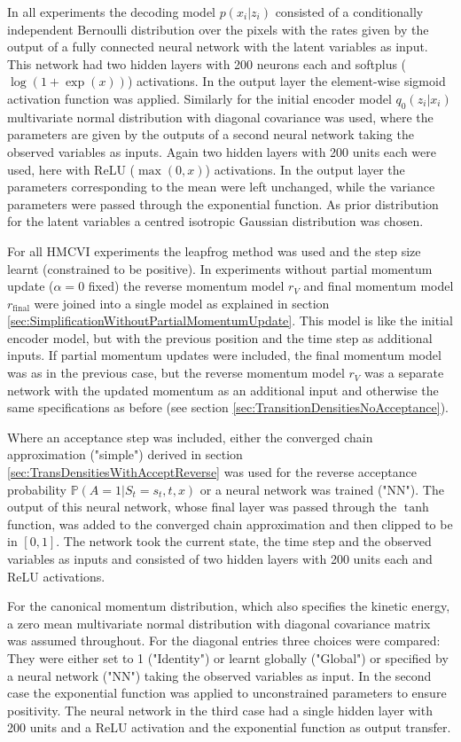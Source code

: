 \documentclass[12pt]{scrartcl}
\begin{document}
In all experiments the decoding model $p(x_i|z_i)$ consisted of a conditionally independent Bernoulli distribution over the pixels with the rates given by the output of a fully connected neural network with the latent variables as input. This network had two hidden layers with 200 neurons each and softplus ($\log(1 + \exp(x))$) activations. In the output layer the element-wise sigmoid activation function was applied. Similarly for the initial encoder model $q_0(z_i|x_i)$ multivariate normal distribution with diagonal covariance was used, where the parameters are given by the outputs of a second neural network taking the observed variables as inputs. Again two hidden layers with 200 units each were used, here with ReLU ($\max(0, x)$) activations. In the output layer the parameters corresponding to the mean were left unchanged, while the variance parameters were passed through the exponential function. As prior distribution for the latent variables a centred isotropic Gaussian distribution was chosen. 

For all HMCVI experiments the leapfrog method was used and the step size learnt (constrained to be positive). In experiments without partial momentum update ($\alpha = 0$ fixed) the reverse momentum model $r_V$ and final momentum model $r_\textrm{final}$ were joined into a single model as explained in section \ref{sec:SimplificationWithoutPartialMomentumUpdate}. This model is like the initial encoder model, but with the previous position and the time step as additional inputs. If partial momentum updates were included, the final momentum model was as in the previous case, but the reverse momentum model $r_V$ was a separate network with the updated momentum as an additional input and otherwise the same specifications as before (see section \ref{sec:TransitionDensitiesNoAcceptance}).

Where an acceptance step was included, either the converged chain approximation ("simple") derived in section \ref{sec:TransDensitiesWithAcceptReverse} was used for the reverse acceptance probability $\mathbb{P}(A = 1|S_t = s_t, t, x)$ or a neural network was trained ("NN"). The output of this neural network, whose final layer was passed through the $\tanh$ function, was added to the converged chain approximation and then clipped to be in $[0, 1]$. The network took the current state, the time step and the observed variables as inputs and consisted of two hidden layers with 200 units each and ReLU activations.

For the canonical momentum distribution, which also specifies the kinetic energy, a zero mean multivariate normal distribution with diagonal covariance matrix was assumed throughout. For the diagonal entries three choices were compared: They were either set to 1 ("Identity") or learnt globally ("Global") or specified by a neural network ("NN") taking the observed variables as input. In the second case the exponential function was applied to unconstrained parameters to ensure positivity. The neural network in the third case had a single hidden layer with 200 units and a ReLU activation and the exponential function as output transfer.
\end{document}
